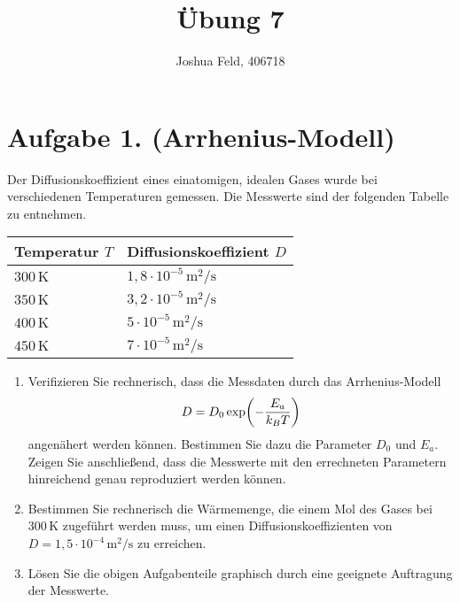 \documentclass[german,12pt]{homework}
\title{Übung 7}
\author{Joshua Feld, 406718}
\institute{RWTH Aachen University\\Aachener Verfahrenstechnik}
\DeclarePairedDelimiter{\enbrace}{(}{)}
\newcommand{\sis}[1]{\,\si{#1}}
\begin{document}
    \maketitle

    \section*{Aufgabe 1. (Arrhenius-Modell)}

    \begin{problem}
        Der Diffusionskoeffizient eines einatomigen, idealen Gases wurde bei verschiedenen Temperaturen gemessen. Die Messwerte sind der folgenden Tabelle zu entnehmen.
        \begin{center}
            \begin{tabular}{ll}
                \toprule
                Temperatur \(T\) & Diffusionskoeffizient \(D\)\\
                \midrule
                \(300\sis{\kelvin}\) & \(1,8 \cdot 10^{-5}\sis{\meter\squared\per\second}\)\\
                \(350\sis{\kelvin}\) & \(3,2 \cdot 10^{-5}\sis{\meter\squared\per\second}\)\\
                \(400\sis{\kelvin}\) & \(5 \cdot 10^{-5}\sis{\meter\squared\per\second}\)\\
                \(450\sis{\kelvin}\) & \(7 \cdot 10^{-5}\sis{\meter\squared\per\second}\)\\
                \bottomrule
            \end{tabular}
        \end{center}
        \begin{enumerate}
            \item Verifizieren Sie rechnerisch, dass die Messdaten durch das Arrhenius-Modell
            \[D = D_0\exp\enbrace*{-\frac{E_a}{k_BT}}\]
            angenähert werden können. Bestimmen Sie dazu die Parameter \(D_0\) und \(E_a\). Zeigen Sie anschließend, dass die Messwerte mit den errechneten Parametern hinreichend genau reproduziert werden können.
            \item Bestimmen Sie rechnerisch die Wärmemenge, die einem Mol des Gases bei \(300\sis{\kelvin}\) zugeführt werden muss, um einen Diffusionskoeffizienten von \(D = 1,5 \cdot 10^{-4}\sis{\meter\squared\per\second}\) zu erreichen.
            \item Lösen Sie die obigen Aufgabenteile graphisch durch eine geeignete Auftragung der Messwerte.
        \end{enumerate}
    \end{problem}
\end{document}
